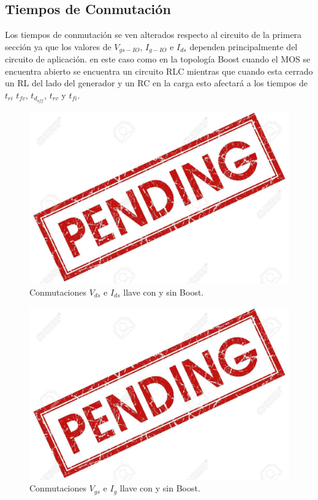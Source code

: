 \subsection{Tiempos de Conmutación}
Los tiempos de conmutación se ven alterados respecto al circuito de la primera sección ya que los valores de $V_{gs-IO}$, $I_{g-IO}$ e $I_{ds}$ dependen principalmente del circuito de aplicación.
en este caso como en la topología Boost cuando el MOS se encuentra abierto se encuentra un circuito RLC mientras que cuando esta cerrado un RL del lado del generador y un RC en la carga esto afectará a los tiempos de $t_{ri}$ $t_{fv}$, $t_{d_{off}}$, $t_{rv}$ y  $t_{fi}$.\\

\begin{multicols}{2}
\begin{figure}[H]
	\centering
	\includegraphics[width=0.9\linewidth]{ImagenesEjercicio-3/pend}
	\caption{Conmutaciones $V_{ds}$ e  $I_{ds}$ llave con y sin Boost.}
	\label{fig:ej3:conmutacionON_OFF_VDS_IDS_SWITCH_BOOST}
\end{figure}
\begin{figure}[H]
	\centering
	\includegraphics[width=0.9\linewidth]{ImagenesEjercicio-3/pend}
	\caption{Conmutaciones $V_{gs}$ e  $I_{g}$ llave con y sin Boost.}
	\label{fig:ej3:conmutacionON_OFF_VGS_IG_SWITCH_BOOST}
\end{figure}
\end{multicols}
